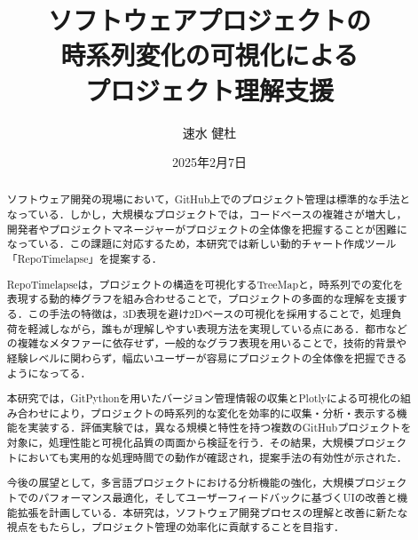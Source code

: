 \documentclass[12pt,twoside]{jbook}
\begin{document}
\title{
  ソフトウェアプロジェクトの\\時系列変化の可視化による\\プロジェクト理解支援
}


\author{%
  速水 健杜
}

\date{2025年2月7日}






\maketitle


\begin{abstract}
  ソフトウェア開発の現場において，GitHub上でのプロジェクト管理は標準的な手法となっている．しかし，大規模なプロジェクトでは，コードベースの複雑さが増大し，開発者やプロジェクトマネージャーがプロジェクトの全体像を把握することが困難になっている．この課題に対応するため，本研究では新しい動的チャート作成ツール「RepoTimelapse」を提案する．
  
  RepoTimelapseは，プロジェクトの構造を可視化するTreeMapと，時系列での変化を表現する動的棒グラフを組み合わせることで，プロジェクトの多面的な理解を支援する．この手法の特徴は，3D表現を避け2Dベースの可視化を採用することで，処理負荷を軽減しながら，誰もが理解しやすい表現方法を実現している点にある．都市などの複雑なメタファーに依存せず，一般的なグラフ表現を用いることで，技術的背景や経験レベルに関わらず，幅広いユーザーが容易にプロジェクトの全体像を把握できるようになってる．
  
  本研究では，GitPythonを用いたバージョン管理情報の収集とPlotlyによる可視化の組み合わせにより，プロジェクトの時系列的な変化を効率的に収集・分析・表示する機能を実装する．評価実験では，異なる規模と特性を持つ複数のGitHubプロジェクトを対象に，処理性能と可視化品質の両面から検証を行う．その結果，大規模プロジェクトにおいても実用的な処理時間での動作が確認され，提案手法の有効性が示された．

  今後の展望として，多言語プロジェクトにおける分析機能の強化，大規模プロジェクトでのパフォーマンス最適化，そしてユーザーフィードバックに基づくUIの改善と機能拡張を計画している．本研究は，ソフトウェア開発プロセスの理解と改善に新たな視点をもたらし，プロジェクト管理の効率化に貢献することを目指す．
\end{abstract}
\end{document}
